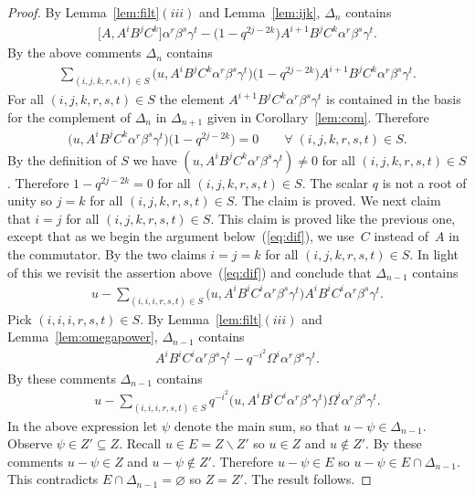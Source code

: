\documentclass[pdftex]{sigma}
\numberwithin{equation}{section}
\begin{document}
\begin{proof}
By
Lemma~\ref{lem:filt}$(iii)$ and
Lemma~\ref{lem:ijk}, $\Delta_n$ contains
\begin{gather*}
\big\lbrack A, A^iB^jC^k \big\rbrack
\alpha^r \beta^s \gamma^t
-
\big(1-q^{2j-2k}\big)  A^{i+1}B^jC^k
\alpha^r \beta^s \gamma^t.
\end{gather*}
By the above comments
$\Delta_n$ contains
\begin{gather*}
\sum_{
(i,j,k,r,s,t) \in S}
\big(u, A^iB^jC^k
\alpha^r \beta^s \gamma^t \big)
\big(1-q^{2j-2k}\big)  A^{i+1}B^jC^k
\alpha^r \beta^s \gamma^t.
\end{gather*}
For all
$(i,j,k,r,s,t) \in S$
the element
$A^{i+1}B^jC^k
\alpha^r \beta^s \gamma^t$
is contained
in the basis for the complement of $\Delta_n$ in $\Delta_{n+1}$
given in Corollary~\ref{lem:com}. Therefore
\begin{gather*}
\big(u, A^iB^jC^k
\alpha^r \beta^s \gamma^t\big)
\big(1-q^{2j-2k}\big)  = 0
\qquad
\forall \;(i,j,k,r,s,t) \in S.
\end{gather*}
By the def\/inition of $S$ we have
$( u, A^iB^jC^k
\alpha^r \beta^s \gamma^t )\not=0$
 for
all
$(i,j,k,r,s,t) \in S$.
Therefore
$1-q^{2j-2k} = 0 $ for all
$(i,j,k,r,s,t) \in S$.
The scalar $q$ is not a root of unity
so $j=k$ for all
$(i,j,k,r,s,t) \in S$.
The claim is proved.
We next claim that
$i=j$ for all
$(i,j,k,r,s,t) \in S$.
This claim is proved like the previous one,
 except that
as we begin the argument below~(\ref{eq:dif}),
we use~$C$ instead of~$A$ in the commutator.
By the two claims
$i=j=k$ for all
$(i,j,k,r,s,t) \in S$.
In light of this we revisit the assertion above~(\ref{eq:dif}) and conclude that
$\Delta_{n-1}$ contains
\begin{gather*}
u-\sum_{
(i,i,i,r,s,t) \in S}
\big(u, A^iB^iC^i
\alpha^r \beta^s \gamma^t \big)
A^{i}B^iC^i
\alpha^r \beta^s \gamma^t.
\end{gather*}
Pick
$(i,i,i,r,s,t) \in S$.
By
Lemma~\ref{lem:filt}$(iii)$ and
Lemma~\ref{lem:omegapower},
$\Delta_{n-1}$ contains
\begin{gather*}
A^iB^iC^i
\alpha^r \beta^s \gamma^t
-q^{-i^2}\Omega^i \alpha^r \beta^s \gamma^t.
\end{gather*}
By these comments
$\Delta_{n-1}$ contains
\begin{gather*}
\label{eq:summ}
u-
\sum_{
(i,i,i,r,s,t) \in S}
q^{-i^2}
\big(u, A^iB^iC^i
\alpha^r \beta^s \gamma^t  \big)
\Omega^i \alpha^r \beta^s \gamma^t.
\end{gather*}
In the above expression let
$\psi$ denote the main sum,
so that
$u-\psi \in \Delta_{n-1}$.
Observe
$\psi \in Z' \subseteq Z$.
Recall $u \in E=Z\backslash Z'$ so
$u \in Z$ and $u \not\in Z'$. By these comments
$u - \psi \in Z$ and
$u - \psi \not\in Z'$.
Therefore $u - \psi \in E$ so
 $u - \psi \in E\cap \Delta_{n-1}$.
This contradicts
 $E\cap \Delta_{n-1}=\varnothing $ so
$Z=Z'$. The result follows.
\end{proof}
\end{document}
